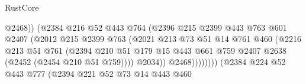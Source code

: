 \begin{lexlean}{RustCore}
\begin{coremodule}
                                            @2468))
                                        (@2384
                                          @216
                                          @52
                                          @443
                                          @764
                                          (@2396
                                            @215
                                            @2399
                                            @443
                                            @763
                                            @601
                                            @2407
                                            (@2012
                                              @215
                                              @2399
                                              @763
                                              (@2021
                                                @213
                                                @73
                                                @51
                                                @14
                                                @761
                                                @460
                                                (@2216
                                                  @213
                                                  @51
                                                  @761
                                                  (@2394
                                                    @210
                                                    @51
                                                    @179
                                                    @15
                                                    @443
                                                    @661
                                                    @759
                                                    @2407
                                                    @2638
                                                    (@2452 (@2454 @210 @51 @759))))
                                                @2034))
                                            @2468))))))))
                            (@2384
                              @224
                              @52
                              @443
                              @777
                              (@2394
                                @221
                                @52
                                @73
                                @14
                                @443
                                @460

\end{coremodule}
\end{lexlean}
